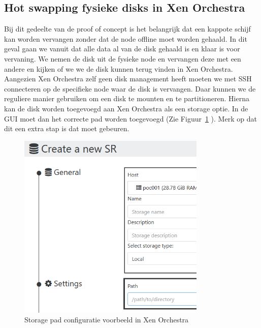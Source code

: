\subsection{Hot swapping fysieke disks in Xen Orchestra}%
Bij dit gedeelte van de proof of concept is het belangrijk dat een kappote schijf kan worden vervangen zonder dat de node offline moet worden gehaald.
In dit geval gaan we vanuit dat alle data al van de disk gehaald is en klaar is voor vervaning.
We nemen de disk uit de fysieke node en vervangen deze met een andere en kijken of we we de disk kunnen terug vinden in Xen Orchestra.
Aangezien Xen Orchestra zelf geen disk management heeft moeten we met SSH connecteren op de specifieke node waar de disk is vervangen. Daar kunnen we de reguliere manier gebruiken om een disk te mounten en te partitioneren.
Hierna kan de disk worden toegevoegd aan Xen Orchestra als een storage optie. In de GUI moet dan het correcte pad worden toegevoegd (Zie Figuur~\ref{fig:storage-path-orch} ). Merk op dat dit een extra stap is dat moet gebeuren.
\begin{figure}[H]
  \centering
  \includegraphics[width=0.8\textwidth]{../poc/storage-path-orch.png}
  \caption{Storage pad configuratie voorbeeld in Xen Orchestra}
  \label{fig:storage-path-orch}  
\end{figure}
